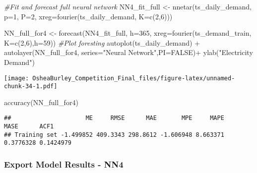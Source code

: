 \documentclass[
]{article}
\newenvironment{Shaded}{\begin{snugshade}}{\end{snugshade}}
\newcommand{\AttributeTok}[1]{\textcolor[rgb]{0.77,0.63,0.00}{#1}}
\newcommand{\CommentTok}[1]{\textcolor[rgb]{0.56,0.35,0.01}{\textit{#1}}}
\newcommand{\ConstantTok}[1]{\textcolor[rgb]{0.00,0.00,0.00}{#1}}
\newcommand{\DecValTok}[1]{\textcolor[rgb]{0.00,0.00,0.81}{#1}}
\newcommand{\FunctionTok}[1]{\textcolor[rgb]{0.00,0.00,0.00}{#1}}
\newcommand{\NormalTok}[1]{#1}
\newcommand{\OtherTok}[1]{\textcolor[rgb]{0.56,0.35,0.01}{#1}}
\newcommand{\SpecialCharTok}[1]{\textcolor[rgb]{0.00,0.00,0.00}{#1}}
\newcommand{\StringTok}[1]{\textcolor[rgb]{0.31,0.60,0.02}{#1}}
\begin{document}
\begin{Shaded}
\begin{Highlighting}[]
\CommentTok{\#Fit and forecast full neural network}
\NormalTok{NN4\_fit\_full }\OtherTok{\textless{}{-}}  \FunctionTok{nnetar}\NormalTok{(ts\_daily\_demand,}
                 \AttributeTok{p=}\DecValTok{1}\NormalTok{,}
                 \AttributeTok{P=}\DecValTok{2}\NormalTok{,}
                 \AttributeTok{xreg=}\FunctionTok{fourier}\NormalTok{(ts\_daily\_demand, }\AttributeTok{K=}\FunctionTok{c}\NormalTok{(}\DecValTok{2}\NormalTok{,}\DecValTok{6}\NormalTok{)))}

\NormalTok{NN\_full\_for4 }\OtherTok{\textless{}{-}} \FunctionTok{forecast}\NormalTok{(NN4\_fit\_full, }
                   \AttributeTok{h=}\DecValTok{365}\NormalTok{,}
                   \AttributeTok{xreg=}\FunctionTok{fourier}\NormalTok{(ts\_demand\_train, }
                                          \AttributeTok{K=}\FunctionTok{c}\NormalTok{(}\DecValTok{2}\NormalTok{,}\DecValTok{6}\NormalTok{),}\AttributeTok{h=}\DecValTok{59}\NormalTok{))}
\CommentTok{\#Plot foresting }
\FunctionTok{autoplot}\NormalTok{(ts\_daily\_demand) }\SpecialCharTok{+}
  \FunctionTok{autolayer}\NormalTok{(NN\_full\_for4, }\AttributeTok{series=}\StringTok{"Neural Network"}\NormalTok{,}\AttributeTok{PI=}\ConstantTok{FALSE}\NormalTok{)}\SpecialCharTok{+}
  \FunctionTok{ylab}\NormalTok{(}\StringTok{"Electricity Demand"}\NormalTok{) }
\end{Highlighting}
\end{Shaded}

\texttt{[image: OsheaBurley\_Competition\_Final\_files/figure-latex/unnamed-chunk-34-1.pdf]}

\begin{Shaded}
\begin{Highlighting}[]
\FunctionTok{accuracy}\NormalTok{(NN\_full\_for4)}
\end{Highlighting}
\end{Shaded}

\begin{verbatim}
##                     ME     RMSE      MAE       MPE     MAPE      MASE      ACF1
## Training set -1.499852 409.3343 298.8612 -1.606948 8.663371 0.3776328 0.1424979
\end{verbatim}

\hypertarget{export-model-results---nn4}{%
\subsubsection{Export Model Results -
NN4}\label{export-model-results---nn4}}
\end{document}
